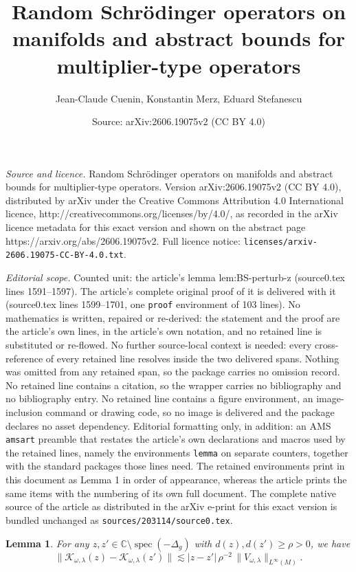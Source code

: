 \documentclass[10pt,a4paper]{amsart}
\title{Random Schr\"odinger operators on manifolds and abstract bounds for multiplier-type operators}
\author{Jean-Claude Cuenin, Konstantin Merz, Eduard Stefanescu}
\date{Source: arXiv:2606.19075v2 (CC BY 4.0)}
\newtheorem{lemma}{Lemma}
\newcommand{\C}{\mathbb{C}}
\DeclareMathOperator{\spec}{spec}
\begin{document}
\maketitle

\noindent\emph{Source and licence.} Random Schr\"odinger operators on manifolds and abstract bounds for multiplier-type operators. Version arXiv:2606.19075v2 (CC BY 4.0), distributed by arXiv under the Creative Commons Attribution 4.0 International licence, http://creativecommons.org/licenses/by/4.0/, as recorded in the arXiv licence metadata for this exact version and shown on the abstract page https://arxiv.org/abs/2606.19075v2. Full licence notice: \texttt{licenses/arxiv-2606.19075-CC-BY-4.0.txt}.\par\smallskip

\noindent\textit{Editorial scope.} Counted unit: the article's lemma lem:BS-perturb-z (source0.tex lines 1591--1597). The article's complete original proof of it is delivered with it (source0.tex lines 1599--1701, one \texttt{proof} environment of 103 lines). No mathematics is written, repaired or re-derived: the statement and the proof are the article's own lines, in the article's own notation, and no retained line is substituted or re-flowed.  No further source-local context is needed: every cross-reference of every retained line resolves inside the two delivered spans.  Nothing was omitted from any retained span, so the package carries no omission record.  No retained line contains a citation, so the wrapper carries no bibliography and no bibliography entry.  No retained line contains a figure environment, an image-inclusion command or drawing code, so no image is delivered and the package declares no asset dependency.  Editorial formatting only, in addition: an AMS \texttt{amsart} preamble that restates the article's own declarations and macros used by the retained lines, namely the environments \texttt{lemma} on separate counters, together with the standard packages those lines need.  The retained environments print in this document as Lemma 1 in order of appearance, whereas the article prints the same items with the numbering of its own full document.  The complete native source of the article as distributed in the arXiv e-print for this exact version is bundled unchanged as \texttt{sources/203114/source0.tex}.
\begin{lemma}\label{lem:BS-perturb-z}
  For any \(z,z'\in \C\setminus \spec(-\Delta_g)\) with $d(z),d(z')\geq  \rho>0$, we have
  \[
    \|\mathcal{K}_{\omega,\lambda}(z)-\mathcal{K}_{\omega,\lambda}(z')\|
    \lesssim |z-z'| \, \rho^{-2}\, \|V_{\omega,\lambda}\|_{L^{\infty}(M)}.
  \]
\end{lemma}
\end{document}

